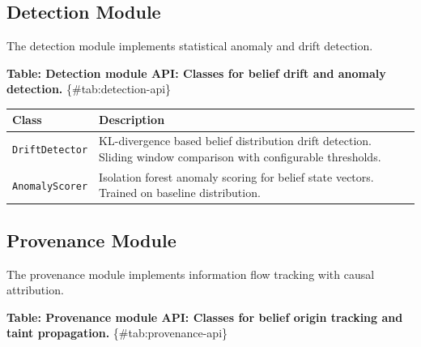 \documentclass[
]{article}
\newcounter{none} %
\begin{document}
\subsection{Detection Module}\label{sec:detection-api}

The detection module implements statistical anomaly and drift detection.

\textbf{Table: Detection module API: Classes for belief drift and
anomaly detection.} \{\#tab:detection-api\}

{\def\LTcaptype{none} %
\begin{longtable}[]{@{}
  >{\raggedright\arraybackslash}p{}
  >{\raggedright\arraybackslash}p{}@{}}
\toprule\noalign{}
\begin{minipage}[b]{\linewidth}\raggedright
Class
\end{minipage} & \begin{minipage}[b]{\linewidth}\raggedright
Description
\end{minipage} \\
\midrule\noalign{}
\endhead
\bottomrule\noalign{}
\endlastfoot
\texttt{DriftDetector} & KL-divergence based belief distribution drift
detection. Sliding window comparison with configurable thresholds. \\
\texttt{AnomalyScorer} & Isolation forest anomaly scoring for belief
state vectors. Trained on baseline distribution. \\
\end{longtable}
}

\subsection{Provenance Module}\label{sec:provenance-api}

The provenance module implements information flow tracking with causal
attribution.

\textbf{Table: Provenance module API: Classes for belief origin tracking
and taint propagation.} \{\#tab:provenance-api\}
\end{document}
